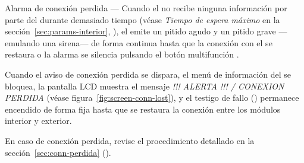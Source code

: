 \begin{descriptioncompact}
\item[Alarma de conexión perdida] --- Cuando el \MIE no recibe ninguna información por parte del \MEE durante demasiado tiempo (véase \emph{Tiempo de espera máximo} en la sección~\ref{sec:params-interior}, \textit{}), el \MIE emite un pitido agudo y un pitido grave ---emulando una sirena--- de forma continua hasta que la conexión con el \MEE se restaura o la alarma se silencia pulsando el botón multifunción .   

Cuando el aviso de conexión perdida se dispara, el menú de información del \MIE se bloquea, la pantalla LCD  muestra el mensaje \emph{!!! ALERTA !!! / CONEXION PERDIDA} (véase figura~\ref{fig:screen-conn-lost}), y el testigo de fallo  () permanece encendido de forma fija hasta que se restaura la conexión entre los módulos interior y exterior. 



En caso de conexión perdida, revise el procedimiento detallado en la sección~\ref{sec:conn-perdida} (\textit{}).
\attend

\end{descriptioncompact}


\cleardoublepage

